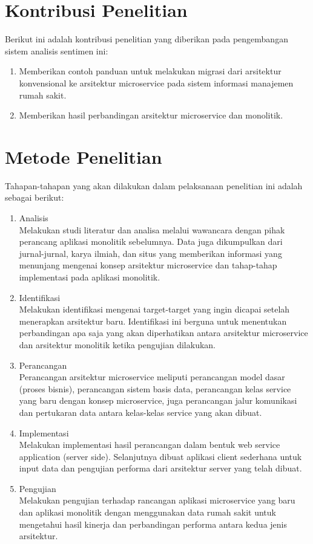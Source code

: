 \section{Kontribusi Penelitian}
Berikut ini adalah kontribusi penelitian yang diberikan pada pengembangan sistem analisis sentimen ini:
\begin{enumerate}[nolistsep,leftmargin=0.5cm]
\item Memberikan contoh panduan untuk melakukan migrasi dari arsitektur konvensional ke arsitektur microservice pada sistem informasi manajemen rumah sakit.
\item Memberikan hasil perbandingan arsitektur microservice dan monolitik.
\end{enumerate}

\section{Metode Penelitian}
Tahapan-tahapan yang akan dilakukan dalam pelaksanaan penelitian ini adalah sebagai berikut:
\begin{enumerate}[nolistsep,leftmargin=0.5cm]
\item Analisis\\
Melakukan studi literatur dan analisa melalui wawancara dengan pihak perancang aplikasi monolitik sebelumnya. Data juga dikumpulkan dari jurnal-jurnal, karya ilmiah, dan situs yang memberikan informasi yang menunjang mengenai konsep arsitektur microservice dan tahap-tahap implementasi pada aplikasi monolitik.
\item Identifikasi\\
Melakukan identifikasi mengenai target-target yang ingin dicapai setelah menerapkan arsitektur baru. Identifikasi ini berguna untuk menentukan perbandingan apa saja yang akan diperhatikan antara arsitektur microservice dan arsitektur monolitik ketika pengujian dilakukan.
\item Perancangan\\
Perancangan arsitektur microservice meliputi perancangan model dasar (proses bisnis), perancangan sistem basis data, perancangan kelas service yang baru dengan konsep microservice, juga perancangan jalur komunikasi dan pertukaran data antara kelas-kelas service yang akan dibuat.
\item Implementasi\\
Melakukan implementasi hasil perancangan dalam bentuk web service application (server side). Selanjutnya dibuat aplikasi client sederhana untuk input data dan pengujian performa dari arsitektur server yang telah dibuat.
\item Pengujian\\
Melakukan pengujian terhadap rancangan aplikasi microservice yang baru dan aplikasi monolitik dengan menggunakan data rumah sakit untuk mengetahui hasil kinerja dan perbandingan performa antara kedua jenis arsitektur.
\end{enumerate}


